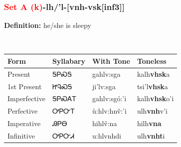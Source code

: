 \subsubsection*{\textcolor{Red}{Set A (k)}{-}\textbf{lh/'l}{-}[vnh-vsk[inf3]]}
\nopagebreak
\textbf{Definition: } he/she is sleepy
\\[0.5em]
\begin{tabularx}{\textwidth}{l X X X}%
\toprule%
\textbf{Form}&\textbf{Syllabary}&\textbf{With Tone}&\textbf{Toneless}\\%
\midrule%
Present&ᎦᏢᏍᎦ&gahlv:sga&kalh\textbf{vhsk}a\\%
1st Present&ᏥᎸᏍᎦ&ji’lv:sga&tsi'l\textbf{vhsk}a\\%
Imperfective&ᎦᏢᏍᎪᎢ&gahlv:sgó:’i&kalh\textbf{vhsk}o'i\\%
Perfective&ᎤᏢᏅᎢ&ù:hlv:hnv̌:’i&ulh\textbf{vnh}v'i\\%
Imperative&ᎯᏢᎾ&hihlv̌:na&hilh\textbf{vna}\\%
Infinitive&ᎤᏢᏅᏗ&u:hlvnhdi&ulh\textbf{vnht}i\\%
\bottomrule%
\end{tabularx}
\\[1em]